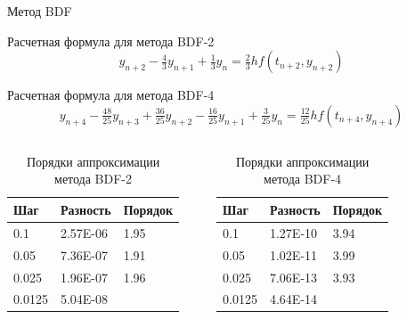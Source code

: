 \documentclass[ignoreonframetext,unicode]{beamer}
\begin{document}
\begin{frame}{Метод BDF}

\begin{block}{Расчетная формула для метода BDF-2}	
	\[
	y_{n+2} - \tfrac43 y_{n+1} + \tfrac13 y_n = \tfrac23 h f(t_{n+2}, y_{n+2})
	\]
\end{block}

\begin{block}{Расчетная формула для метода BDF-4}	
	\vspace{-3mm}
	\[
	y_{n+4} - \tfrac{48}{25} y_{n+3} + \tfrac{36}{25} y_{n+2} - \tfrac{16}{25} y_{n+1} + \tfrac{3}{25} y_n = \tfrac{12}{25} h f(t_{n+4}, y_{n+4})
	\]
\end{block}

\begin{columns}
	\begin{table}[!htbp]
		\centering
		\begin{tabular}{|l|l|l|} 
			\hline
			Шаг      & Разность     & Порядок            \\ 
			\hline
			0.1    & 2.57E-06 & 1.95  \\ 
			\hline
			0.05   & 7.36E-07 & 1.91  \\ 
			\hline
			0.025  & 1.96E-07 & 1.96  \\ 
			\hline
			0.0125 & 5.04E-08 &              \\
			\hline
		\end{tabular}
		\vspace*{4mm}
		\label{table-BDF-2}
		\caption{Порядки аппроксимации метода BDF-2}
	\end{table}
	
	\begin{table}[!htbp]
		\centering
		\begin{tabular}{|l|l|l|} 
			\hline
			Шаг      & Разность     & Порядок \\        \hline
			0.1    & 1.27E-10 & 3.94  \\ 
			\hline
			0.05   & 1.02E-11 & 3.99  \\ 
			\hline
			0.025  & 7.06E-13 & 3.93  \\ 
			\hline
			0.0125 & 4.64E-14 &              \\
			\hline
		\end{tabular}
		\vspace*{2mm}
		\label{table-BDF-4}
		\caption{Порядки аппроксимации метода BDF-4}
	\end{table}
\end{columns}

\end{frame}	
\end{document}
